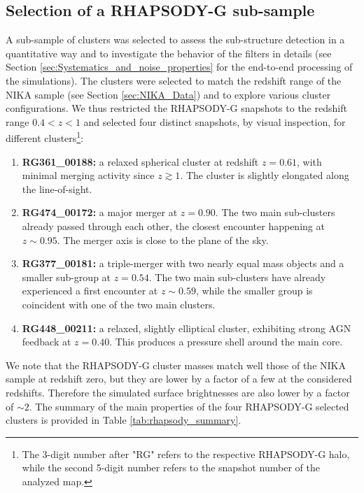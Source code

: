 \documentclass[twocolumn,traditabstract]{aa}
\begin{document}
\subsection{Selection of a RHAPSODY-G sub-sample}\label{sec:Selection_of_a_RHAPSODY-G_sub-sample}
A sub-sample of clusters was selected to assess the sub-structure detection in a quantitative way and to investigate the behavior of the filters in details (see Section \ref{sec:Systematics_and_noise_properties} for the end-to-end processing of the simulations). The clusters were selected to match the redshift range of the NIKA sample (see Section \ref{sec:NIKA_Data}) and to explore various cluster configurations. We thus restricted the RHAPSODY-G snapshots to the redshift range $0.4<z<1$ and selected four distinct snapshots, by visual inspection, for different clusters\footnote{The 3-digit number after "RG" refers to the respective RHAPSODY-G halo, while the second 5-digit number refers to the snapshot number of the analyzed map.}:
\begin{enumerate}
\item {\bf RG361\_00188:} a relaxed spherical cluster at redshift $z = 0.61$, with minimal merging activity since $z \gtrsim 1$. The cluster is slightly elongated along the line-of-sight.
\item {\bf RG474\_00172:} a major merger at $z = 0.90$. The two main sub-clusters already passed through each other, the closest encounter happening at $z \sim 0.95$. The merger axis is close to the plane of the sky. 
\item {\bf RG377\_00181:} a triple-merger with two nearly equal mass objects and a smaller sub-group at $z = 0.54$. The two main sub-clusters have already experienced a first encounter at $z \sim 0.59$, while the smaller group is coincident with one of the two main clusters.
\item {\bf RG448\_00211:} a relaxed, slightly elliptical cluster, exhibiting strong AGN feedback at $z = 0.40$. This produces a pressure shell around the main core.
\end{enumerate}
We note that the RHAPSODY-G cluster masses match well those of the NIKA sample at redshift zero, but they are lower by a factor of a few at the considered redshifts. Therefore the simulated surface brightnesses are also lower by a factor of $\sim 2$. The summary of the main properties of the four RHAPSODY-G selected clusters is provided in Table \ref{tab:rhapsody_summary}.

\end{document}
